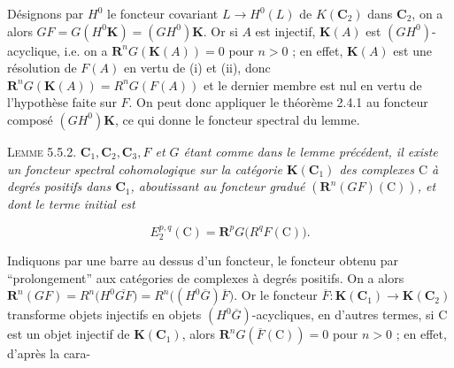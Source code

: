 Désignons par $H^0$ le foncteur covariant $L\to H^0(L)$ de
$K({\mathbf C}_2)$ dans ${\mathbf C}_2$, on a alors
$GF=G(H^0\mathbf K)=(GH^0)\mathbf K$. Or si $A$ est injectif, $\mathbf K(A)$
est $(GH^0)$-acyclique, i.e. on a ${\mathbf R}^nG(\mathbf K(A))=0$ pour $n>0$ ; en
effet, $\mathbf K(A)$ est une résolution de $F(A)$ en vertu de (i) et (ii),
donc ${\mathbf R}^nG(\mathbf K(A))=R^nG(F(A))$ et le dernier membre est nul en vertu de
l'hypothèse faite sur $F$. On peut donc appliquer le théorème 2.4.1 au
foncteur composé $(GH^0)\mathbf K$, ce qui donne le foncteur spectral du lemme.

\textsc{Lemme 5.5.2.} \textit{${\mathbf C}_1,{\mathbf C}_2,{\mathbf C}_3,F$ et $G$ étant comme
dans le lemme précédent, il existe un foncteur spectral cohomologique sur la
catégorie $\mathbf K({\mathbf C}_1)$ des complexes $\mathrm C$ à degrés positifs dans ${\mathbf C}_1$,
aboutissant au foncteur gradué $({\mathbf R}^n(GF)(\mathrm C))$, et dont le terme initial est}

\[
\tag{5.5.2}
E_2^{p,q}(\mathrm C)={\mathbf R}^pG\bigl(R^qF(\mathrm C)\bigr).
\]

Indiquons par une barre au dessus d'un foncteur, le foncteur obtenu par
``prolongement'' aux catégories de complexes à degrés positifs. On a alors
${\mathbf R}^n(GF)=R^n\bigl(H^0\overline{GF}\bigr)=R^n\bigl((H^0\overline G)\overline F\bigr)$.
Or le foncteur $\overline F:\mathbf K({\mathbf C}_1)\to\mathbf K({\mathbf C}_2)$
transforme objets injectifs en objets $(H^0\overline G)$-acycliques, en
d'autres termes, si $\mathrm C$ est un objet injectif de $\mathbf K({\mathbf C}_1)$, alors
${\mathbf R}^nG(\overline F(\mathrm C))=0$ pour $n>0$ ; en effet, d'après la cara-

